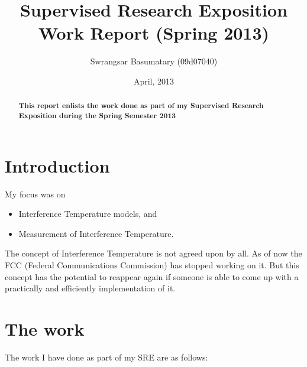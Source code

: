 \documentclass[10pt]{article}
\title{Supervised Research Exposition Work Report (Spring 2013)}
\author{Swrangsar Basumatary (09d07040)}
\date{April, 2013}
\begin{document}
\maketitle

\begin{abstract}
    \textbf{This report enlists the work done as part of my Supervised Research Exposition during the Spring Semester 2013}
\end{abstract}

\section{Introduction}
My focus was on 

\begin{itemize}
    \item Interference Temperature models, and
    \item Measurement of Interference Temperature.
\end{itemize}

The concept of Interference Temperature is not agreed upon by all. As of now the FCC (Federal Communications Commission) has stopped working on it. But this concept has the potential to reappear again if someone is able to come up with a practically and efficiently implementation of it.

\section{The work}

The work I have done as part of my SRE are as follows:
\end{document}
